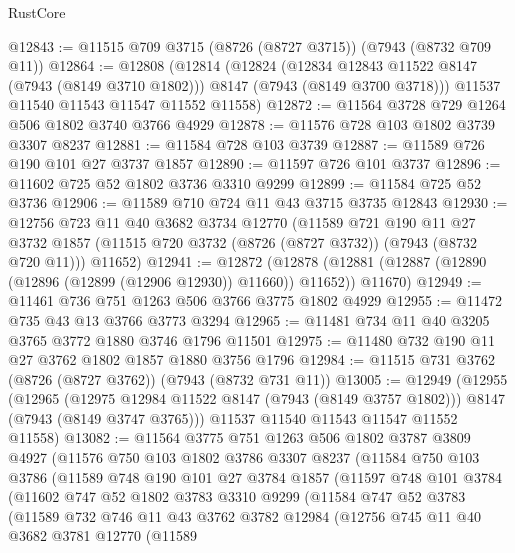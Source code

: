 \begin{lexlean}{RustCore}
\begin{coremodule}
@12843 := @11515 @709 @3715 (@8726 (@8727 @3715)) (@7943 (@8732 @709 @11))
@12864 := @12808
    (@12814
      (@12824
        (@12834 @12843 @11522 @8147 (@7943 (@8149 @3710 @1802)))
        @8147
        (@7943 (@8149 @3700 @3718)))
      @11537
      @11540
      @11543
      @11547
      @11552
      @11558)
@12872 := @11564 @3728 @729 @1264 @506 @1802 @3740 @3766 @4929
@12878 := @11576 @728 @103 @1802 @3739 @3307 @8237
@12881 := @11584 @728 @103 @3739
@12887 := @11589 @726 @190 @101 @27 @3737 @1857
@12890 := @11597 @726 @101 @3737
@12896 := @11602 @725 @52 @1802 @3736 @3310 @9299
@12899 := @11584 @725 @52 @3736
@12906 := @11589 @710 @724 @11 @43 @3715 @3735 @12843
@12930 := @12756
    @723
    @11
    @40
    @3682
    @3734
    @12770
    (@11589
      @721
      @190
      @11
      @27
      @3732
      @1857
      (@11515 @720 @3732 (@8726 (@8727 @3732)) (@7943 (@8732 @720 @11)))
      @11652)
@12941 := @12872
    (@12878 (@12881 (@12887 (@12890 (@12896 (@12899 (@12906 @12930)) @11660)) @11652)) @11670)
@12949 := @11461 @736 @751 @1263 @506 @3766 @3775 @1802 @4929
@12955 := @11472 @735 @43 @13 @3766 @3773 @3294
@12965 := @11481 @734 @11 @40 @3205 @3765 @3772 @1880 @3746 @1796 @11501
@12975 := @11480 @732 @190 @11 @27 @3762 @1802 @1857 @1880 @3756 @1796
@12984 := @11515 @731 @3762 (@8726 (@8727 @3762)) (@7943 (@8732 @731 @11))
@13005 := @12949
    (@12955
      (@12965
        (@12975 @12984 @11522 @8147 (@7943 (@8149 @3757 @1802)))
        @8147
        (@7943 (@8149 @3747 @3765)))
      @11537
      @11540
      @11543
      @11547
      @11552
      @11558)
@13082 := @11564
    @3775
    @751
    @1263
    @506
    @1802
    @3787
    @3809
    @4927
    (@11576
      @750
      @103
      @1802
      @3786
      @3307
      @8237
      (@11584
        @750
        @103
        @3786
        (@11589
          @748
          @190
          @101
          @27
          @3784
          @1857
          (@11597
            @748
            @101
            @3784
            (@11602
              @747
              @52
              @1802
              @3783
              @3310
              @9299
              (@11584
                @747
                @52
                @3783
                (@11589
                  @732
                  @746
                  @11
                  @43
                  @3762
                  @3782
                  @12984
                  (@12756
                    @745
                    @11
                    @40
                    @3682
                    @3781
                    @12770
                    (@11589

\end{coremodule}
\end{lexlean}
